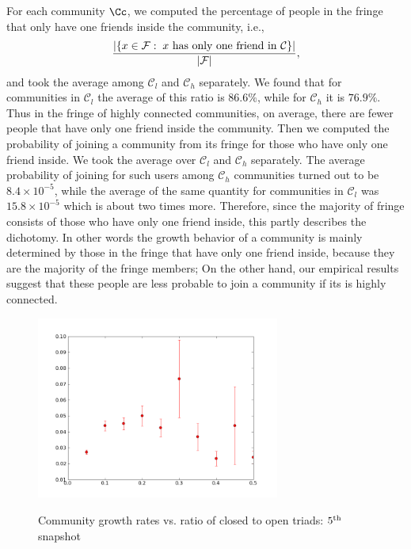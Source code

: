 For each community $\Cc$, we computed the percentage of people in the fringe that only have one friends inside the community, i.e., 
\[
\frac{|\{x\in\mathcal{F} : \; x \textmd{ has only one friend in } \mathcal{C} \}|}{|\mathcal{F}|},
\]
and took the average among $\mathcal{C}_l$ and $\mathcal{C}_h$ separately. 
We found that for communities in $\mathcal{C}_l$ the average of this ratio is $86.6\%$, while for $\mathcal{C}_h$ it is
$76.9\%$.
Thus in the fringe of highly connected communities, on average, there are fewer people that have only one friend inside the community. Then we computed the probability 
of joining a community from its fringe for those who have only one friend inside. We took the average over $\mathcal{C}_l$ and $\mathcal{C}_h$ separately. 
The average probability of joining for such users among $\mathcal{C}_h$ communities turned out to be $8.4\times10^{-5}$, while the average of the same 
quantity for communities in $\mathcal{C}_l$ was $15.8\times 10^{-5}$ which is about two times  more. Therefore, since the majority of fringe consists of those who have only one friend inside, this partly describes the dichotomy. In other words the growth behavior  of a community is mainly determined by those in the fringe that have only one friend inside, because they are the majority of the fringe members; On the other hand, our empirical results suggest that these people are less probable to join a community if its is highly connected. 

\begin{figure}
  \begin{center}
    \includegraphics[width=8cm]{fifth.png}\label{fig:edge-e}
    \caption{Community growth rates vs. ratio of closed to open triads: $5^{\rm th}$ snapshot}
    \end{center}
\end{figure}


